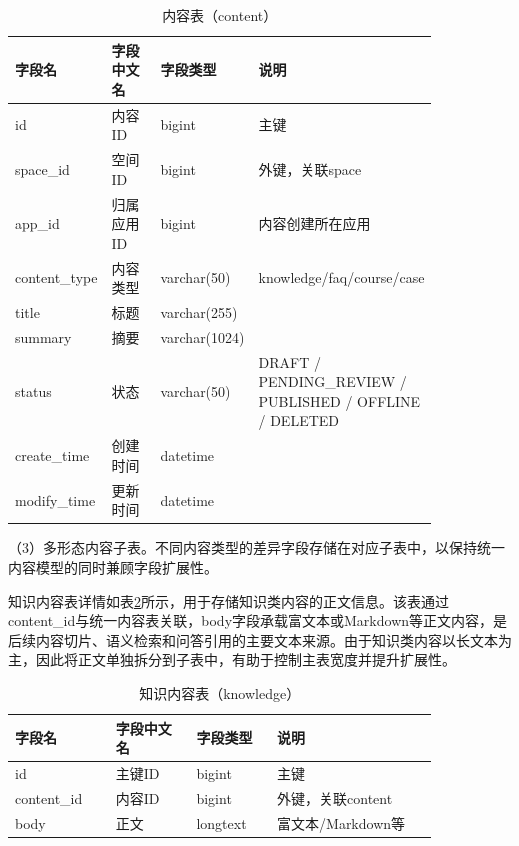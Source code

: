 \begin{table}[!htbp]
  \centering
  \caption{内容表（content）}
  \label{tab:db_content}
  \small
  \begin{tabular}{>{\raggedright\arraybackslash}p{0.20\linewidth}|>{\raggedright\arraybackslash}p{0.16\linewidth}|>{\raggedright\arraybackslash}p{0.16\linewidth}|>{\raggedright\arraybackslash}p{0.32\linewidth}}
    \hline
    字段名 & 字段中文名 & 字段类型 & 说明 \\ \hline
    id & 内容ID & bigint & 主键 \\ \hline
    space\_id & 空间ID & bigint & 外键，关联space \\ \hline
    app\_id & 归属应用ID & bigint & 内容创建所在应用 \\ \hline
    content\_type & 内容类型 & varchar(50) & knowledge/faq/course/case \\ \hline
    title & 标题 & varchar(255) & \\ \hline
    summary & 摘要 & varchar(1024) & \\ \hline
    status & 状态 & varchar(50) & DRAFT / PENDING\_REVIEW / PUBLISHED / OFFLINE / DELETED \\ \hline
    create\_time & 创建时间 & datetime & \\ \hline
    modify\_time & 更新时间 & datetime & \\ \hline
  \end{tabular}
\end{table}

（3）多形态内容子表。不同内容类型的差异字段存储在对应子表中，以保持统一内容模型的同时兼顾字段扩展性。

知识内容表详情如表\ref{tab:db_knowledge}所示，用于存储知识类内容的正文信息。该表通过content\_\allowbreak id与统一内容表关联，body字段承载富文本或Markdown等正文内容，是后续内容切片、语义检索和问答引用的主要文本来源。由于知识类内容以长文本为主，因此将正文单独拆分到子表中，有助于控制主表宽度并提升扩展性。

\begin{table}[!htbp]
  \centering
  \caption{知识内容表（knowledge）}
  \label{tab:db_knowledge}
  \small
  \begin{tabular}{>{\raggedright\arraybackslash}p{0.20\linewidth}|>{\raggedright\arraybackslash}p{0.16\linewidth}|>{\raggedright\arraybackslash}p{0.16\linewidth}|>{\raggedright\arraybackslash}p{0.32\linewidth}}
    \hline
    字段名 & 字段中文名 & 字段类型 & 说明 \\ \hline
    id & 主键ID & bigint & 主键 \\ \hline
    content\_id & 内容ID & bigint & 外键，关联content \\ \hline
    body & 正文 & longtext & 富文本/Markdown等 \\ \hline
  \end{tabular}
\end{table}


